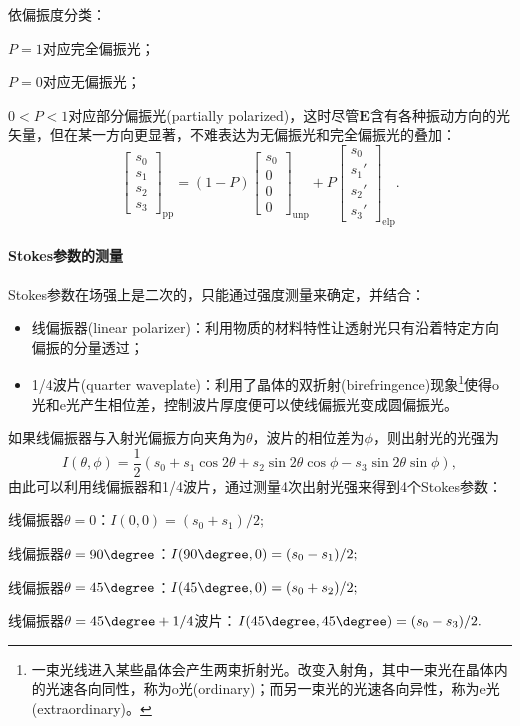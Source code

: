 \begin{corollary}
    依偏振度分类：
    \begin{compactitem}
    	\item $P=1$对应完全偏振光；
    	\item $P=0$对应无偏振光；
    	\item $0<P<1$对应部分偏振光(partially polarized)，这时尽管$\bm E$含有各种振动方向的光矢量，但在某一方向更显著，不难表达为无偏振光和完全偏振光的叠加：
        \[
            \begin{bmatrix}
                s_0\\s_1\\s_2\\s_3
            \end{bmatrix}_\text{pp}=(1-P)
            \begin{bmatrix}
                s_0\\0\\0\\0
            \end{bmatrix}_\text{unp}+P
            \begin{bmatrix}
                s_0\\s_1'\\s_2'\\s_3'
            \end{bmatrix}_\text{elp}.
        \]
    \end{compactitem}
\end{corollary}

\paragraph{Stokes参数的测量}

Stokes参数在场强上是二次的，只能通过强度测量来确定，并结合：
\begin{itemize}
    \item 线偏振器(linear polarizer)：利用物质的材料特性让透射光只有沿着特定方向偏振的分量透过；
    \item 1/4波片(quarter waveplate)：利用了晶体的双折射(birefringence)现象\footnote{一束光线进入某些晶体会产生两束折射光。改变入射角，其中一束光在晶体内的光速各向同性，称为o光(ordinary)；而另一束光的光速各向异性，称为e光(extraordinary)。}使得o光和e光产生相位差，控制波片厚度便可以使线偏振光变成圆偏振光。
\end{itemize}
如果线偏振器与入射光偏振方向夹角为$\theta$，波片的相位差为$\phi$，则出射光的光强为
\[
    I(\theta,\phi)=\frac12(s_0+s_1\cos2\theta+s_2\sin2\theta\cos\phi-s_3\sin2\theta\sin\phi),
\]
由此可以利用线偏振器和1/4波片，通过测量4次出射光强来得到4个Stokes参数：
\begin{compactitem}
	\item 线偏振器$\theta=0$：$I(0,0)=(s_0+s_1)/2;$
    \item 线偏振器$\theta=90\degree$：$I(90\degree,0)=(s_0-s_1)/2;$
    \item 线偏振器$\theta=45\degree$：$I(45\degree,0)=(s_0+s_2)/2;$
    \item 线偏振器$\theta=45\degree+1/4$波片：$I(45\degree,45\degree)=(s_0-s_3)/2.$
\end{compactitem}

